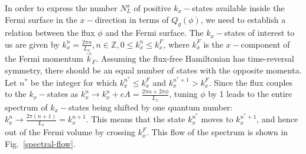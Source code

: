 In order to express the number \(N_L^x\) of positive \(k_x-\)states available inside the Fermi surface in the \(x-\)direction in terms of \(Q_g(\phi)\), we need to establish a relation between the flux \(\phi\) and the Fermi surface. The \(k_x-\)states of interest to us are given by \(k_x^n = \frac{2\pi n}{L_x}, n\in \mathbb{Z}, 0 \leq k_x^n \leq k^F_x\), where \(k_x^F\) is the \(x-\)component of the Fermi momentum \(\vec k_F\). Assuming the flux-free Hamiltonian has time-reversal symmetry, there should be an equal number of states with the opposite momenta. Let \(n^*\) be the integer for which \(k_x^{n^*} \leq k^F_x\) and \(k_x^{n^* + 1} > k^F_x\). Since the flux couples to the \(k_x-\)states as \(k_x^n \to k_x^n + eA = \frac{2\pi n + 2\pi \phi}{L_x}\), tuning \(\phi\) by 1 leads to the entire spectrum of \(k_x-\)states being shifted by one quantum number: \(k_x^n \to \frac{2\pi \left(n + 1\right)}{L_x} = k_x^{n+1}\).
This means that the state \(k_x^{n^*}\) moves to \(k_x^{n^*+1}\), and hence out of the Fermi volume by crossing \(k^F_x\). This flow of the spectrum is shown in Fig.~\ref{spectral-flow}.

